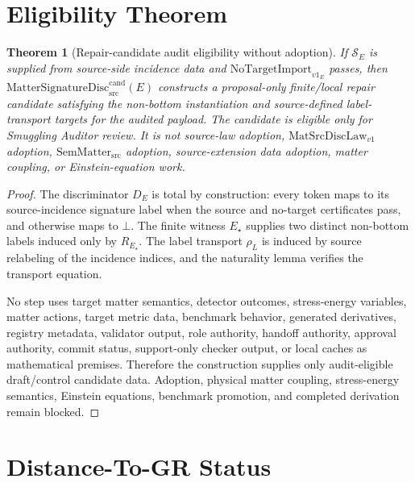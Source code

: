 \documentclass[11pt]{article}
\newcommand{\MatSrcDiscLaw}{\mathrm{MatSrcDiscLaw}_{v1}}
\newcommand{\SemMatterSrc}{\mathrm{SemMatter}_{\mathrm{src}}}
\newcommand{\MatSigDisc}{\mathrm{MatterSignatureDisc}_{\mathrm{src}}^{\mathrm{cand}}}
\newcommand{\Bottom}{\bot}
\newcommand{\NoTarget}{\mathrm{NoTargetImport}_{v1}}
\newtheorem{theorem}{Theorem}
\begin{document}
\section{Eligibility Theorem}

\begin{theorem}[Repair-candidate audit eligibility without adoption]
If \(\mathcal{S}_E\) is supplied from source-side incidence data and
\(\NoTarget_E\) passes, then \(\MatSigDisc(E)\) constructs a proposal-only
finite/local repair candidate satisfying the non-bottom instantiation and
source-defined label-transport targets for the audited payload. The candidate
is eligible only for Smuggling Auditor review. It is not source-law adoption,
\(\MatSrcDiscLaw\) adoption, \(\SemMatterSrc\) adoption, source-extension data
adoption, matter coupling, or Einstein-equation work.
\end{theorem}

\begin{proof}
The discriminator \(D_E\) is total by construction: every token maps to its
source-incidence signature label when the source and no-target certificates
pass, and otherwise maps to \(\Bottom\). The finite witness \(E_\star\)
supplies two distinct non-bottom labels induced only by \(R_{E_\star}\). The
label transport \(\rho_L\) is induced by source relabeling of the incidence
indices, and the naturality lemma verifies the transport equation.

No step uses target matter semantics, detector outcomes, stress-energy
variables, matter actions, target metric data, benchmark behavior, generated
derivatives, registry metadata, validator output, role authority, handoff
authority, approval authority, commit status, support-only checker output, or
local caches as mathematical premises. Therefore the construction supplies
only audit-eligible draft/control candidate data. Adoption, physical matter
coupling, stress-energy semantics, Einstein equations, benchmark promotion,
and completed derivation remain blocked.
\end{proof}

\section{Distance-To-GR Status}
\end{document}
